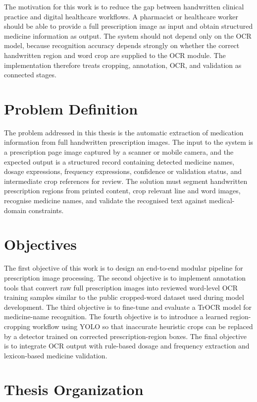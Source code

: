\documentclass[modernstyle,12pt]{thesis}
\begin{document}
The motivation for this work is to reduce the gap between handwritten clinical practice and digital healthcare workflows. A pharmacist or healthcare worker should be able to provide a full prescription image as input and obtain structured medicine information as output. The system should not depend only on the OCR model, because recognition accuracy depends strongly on whether the correct handwritten region and word crop are supplied to the OCR module. The implementation therefore treats cropping, annotation, OCR, and validation as connected stages.

\section{Problem Definition}
\label{sec:problem-definition}

The problem addressed in this thesis is the automatic extraction of medication information from full handwritten prescription images. The input to the system is a prescription page image captured by a scanner or mobile camera, and the expected output is a structured record containing detected medicine names, dosage expressions, frequency expressions, confidence or validation status, and intermediate crop references for review. The solution must segment handwritten prescription regions from printed content, crop relevant line and word images, recognise medicine names, and validate the recognised text against medical-domain constraints.

\section{Objectives}

The first objective of this work is to design an end-to-end modular pipeline for prescription image processing. The second objective is to implement annotation tools that convert raw full prescription images into reviewed word-level OCR training samples similar to the public cropped-word dataset used during model development. The third objective is to fine-tune and evaluate a TrOCR model for medicine-name recognition. The fourth objective is to introduce a learned region-cropping workflow using YOLO so that inaccurate heuristic crops can be replaced by a detector trained on corrected prescription-region boxes. The final objective is to integrate OCR output with rule-based dosage and frequency extraction and lexicon-based medicine validation.

\section{Thesis Organization}
\end{document}

